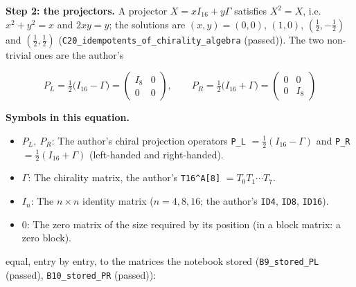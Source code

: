 \documentclass[
  10pt,
]{article}
\providecommand{\tightlist}{%
  \setlength{\itemsep}{0pt}\setlength{\parskip}{0pt}}
\begin{document}
\textbf{Step 2: the projectors.} A projector \(X = xI_{16} + y\Gamma\)
satisfies \(X^2 = X\), i.e.~\(x^2 + y^2 = x\) and \(2xy = y\); the
solutions are \((x, y) = (0, 0)\), \((1, 0)\), \((\tfrac12, -\tfrac12)\)
and \((\tfrac12, \tfrac12)\)
(\texttt{C20\_idempotents\_of\_chirality\_algebra} (passed)). The two
non-trivial ones are the author's

\[
P_L = \tfrac12\big(I_{16} - \Gamma\big) = \begin{pmatrix} I_8 & 0 \\ 0 & 0 \end{pmatrix},\qquad P_R = \tfrac12\big(I_{16} + \Gamma\big) = \begin{pmatrix} 0 & 0 \\ 0 & I_8 \end{pmatrix}
\]

\textbf{Symbols in this equation.}

\begin{itemize}
\tightlist
\item
  \(P_L,\ P_R\): The author's chiral projection operators \texttt{P\_L}
  \(= \tfrac12(I_{16} - \Gamma)\) and \texttt{P\_R}
  \(= \tfrac12(I_{16} + \Gamma)\) (left-handed and right-handed).
\item
  \(\Gamma\): The chirality matrix, the author's
  \texttt{T16\^{}A{[}8{]}} \(= T_0 T_1 \cdots T_7\).
\item
  \(I_n\): The \(n \times n\) identity matrix (\(n = 4, 8, 16\); the
  author's \texttt{ID4}, \texttt{ID8}, \texttt{ID16}).
\item
  \(0\): The zero matrix of the size required by its position (in a
  block matrix: a zero block).
\end{itemize}

equal, entry by entry, to the matrices the notebook stored
(\texttt{B9\_stored\_PL} (passed), \texttt{B10\_stored\_PR} (passed)):
\end{document}
